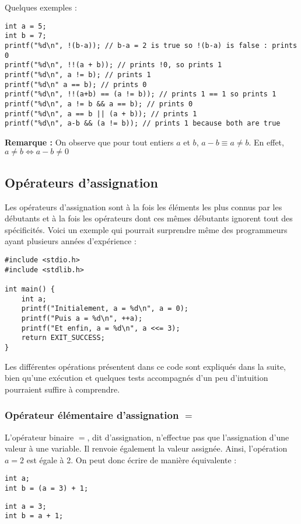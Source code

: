 \documentclass[../../../main.tex]{subfiles}
\begin{document}
Quelques exemples :
\begin{verbatim}
int a = 5;
int b = 7;
printf("%d\n", !(b-a)); // b-a = 2 is true so !(b-a) is false : prints 0
printf("%d\n", !!(a + b)); // prints !0, so prints 1
printf("%d\n", a != b); // prints 1
printf("%d\n" a == b); // prints 0
printf("%d\n", !!(a+b) == (a != b)); // prints 1 == 1 so prints 1
printf("%d\n", a != b && a == b); // prints 0
printf("%d\n", a == b || (a + b)); // prints 1
printf("%d\n", a-b && (a != b)); // prints 1 because both are true
\end{verbatim}
\textbf{Remarque :} On observe que pour tout entiers $a$ et $b$, $a-b\equiv a \neq b$. En effet, $a \neq b \Leftrightarrow a - b \neq{0}$
\subsection{Opérateurs d'assignation}
Les opérateurs d'assignation sont à la fois les éléments les plus connus par les débutants et à la fois les opérateurs dont ces mêmes débutants ignorent tout des spécificités. Voici un exemple qui pourrait surprendre même des programmeurs ayant plusieurs années d'expérience :
\begin{verbatim}
#include <stdio.h>
#include <stdlib.h>

int main() {
	int a;
	printf("Initialement, a = %d\n", a = 0);
	printf("Puis a = %d\n", ++a);
	printf("Et enfin, a = %d\n", a <<= 3);
	return EXIT_SUCCESS;
}
\end{verbatim}
Les différentes opérations présentent dans ce code sont expliqués dans la suite, bien qu'une exécution et quelques tests accompagnés d'un peu d'intuition pourraient suffire à comprendre.
 
\subsubsection{Opérateur élémentaire d'assignation $=$}
 
L'opérateur binaire $=$, dit d'assignation, n'effectue pas que l'assignation d'une valeur à une variable. Il renvoie également la valeur assignée.\newline
Ainsi, l'opération $a = 2$ est égale à 2. On peut donc écrire de manière équivalente :

\begin{minipage}{0.5\textwidth}
\begin{verbatim}
int a;
int b = (a = 3) + 1;
\end{verbatim}
\end{minipage}
\begin{minipage}{0.5\textwidth}
\begin{verbatim}
int a = 3;
int b = a + 1;
\end{verbatim}
\end{minipage}
\end{document}
